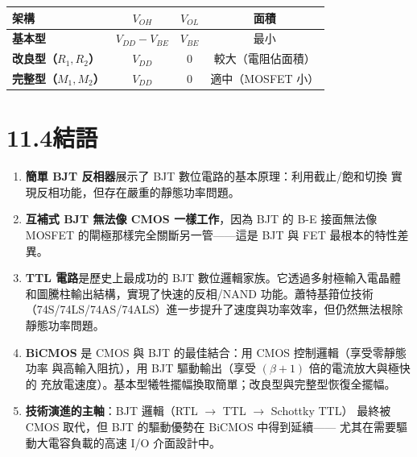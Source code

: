 \documentclass[12pt]{article}
\begin{document}
\begin{keybox}
\begin{center}
\renewcommand{\arraystretch}{1.3}
\begin{tabular}{>{\bfseries}l c c c}
\toprule
\textbf{架構} & $V_{OH}$ & $V_{OL}$ & \textbf{面積} \\
\midrule
基本型 & $V_{DD}-V_{BE}$ & $V_{BE}$ & 最小 \\
改良型（$R_1,R_2$） & $V_{DD}$ & $0$ & 較大（電阻佔面積）\\
完整型（$M_1,M_2$） & $V_{DD}$ & $0$ & 適中（MOSFET 小）\\
\bottomrule
\end{tabular}
\end{center}
\end{keybox}

\section*{11.4\quad 結語}

\begin{keybox}[本章核心觀念總結]
\begin{enumerate}[leftmargin=2em,itemsep=4pt]
\item \textbf{簡單 BJT 反相器}展示了 BJT 數位電路的基本原理：利用截止/飽和切換
  實現反相功能，但存在嚴重的靜態功率問題。

\item \textbf{互補式 BJT 無法像 CMOS 一樣工作}，因為 BJT 的 B-E 接面無法像
  MOSFET 的閘極那樣完全關斷另一管——這是 BJT 與 FET 最根本的特性差異。

\item \textbf{TTL 電路}是歷史上最成功的 BJT 數位邏輯家族。它透過多射極輸入電晶體
  和圖騰柱輸出結構，實現了快速的反相/NAND 功能。蕭特基箝位技術
  （74S/74LS/74AS/74ALS）進一步提升了速度與功率效率，但仍然無法根除
  靜態功率問題。

\item \textbf{BiCMOS} 是 CMOS 與 BJT 的最佳結合：用 CMOS 控制邏輯（享受零靜態功率
  與高輸入阻抗），用 BJT 驅動輸出（享受 $(\beta+1)$ 倍的電流放大與極快的
  充放電速度）。基本型犧牲擺幅換取簡單；改良型與完整型恢復全擺幅。

\item \textbf{技術演進的主軸}：BJT 邏輯（RTL $\to$ TTL $\to$ Schottky TTL）
  最終被 CMOS 取代，但 BJT 的驅動優勢在 BiCMOS 中得到延續——
  尤其在需要驅動大電容負載的高速 I/O 介面設計中。
\end{enumerate}
\end{keybox}
\end{document}
